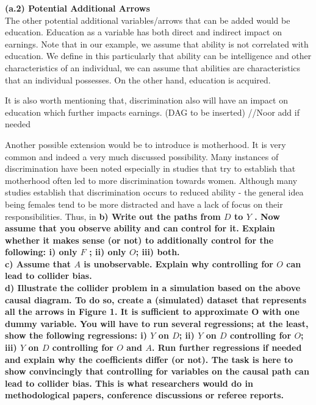 \documentclass[a4paper,12pt,oneside,English]{article}
\begin{document}
\textbf{(a.2) Potential Additional Arrows}\\
The other potential additional variables/arrows that can be added would be education. Education as a variable has both direct and indirect impact on earnings. Note that in our example, we assume that ability is not correlated with education. We define in this particularly that ability can be intelligence and other characteristics of an individual, we can assume that abilities are characteristics that an individual possesses. On the other hand, education is acquired.

It is also worth mentioning that, discrimination also will have an impact on education which further impacts earnings. (DAG to be inserted) //Noor add if needed

Another possible extension would be to introduce is motherhood. It is very common and indeed a very much discussed possibility. Many instances of discrimination have been noted especially in studies that try to establish that motherhood often led to more discrimination towards women. Although many studies establish that  discrimination occurs to reduced ability - the general idea being females tend to be more distracted and have a lack of focus on their responsibilities. Thus, in
\textbf{b) Write out the paths from $D$ to $Y$ . Now assume that you observe ability and can control for it. Explain whether it makes sense (or not) to additionally control for the following: i) only $F$ ; ii) only $O$; iii) both.}\\
\textbf{c) Assume that $A$ is unobservable. Explain why controlling for $O$ can lead to collider bias.}\\
\textbf{d) Illustrate the collider problem in a simulation based on the above causal diagram. To do so, create a (simulated) dataset that represents all the arrows in Figure 1. It is sufficient to approximate O with one dummy variable. You will have to run several regressions; at the least, show the following regressions: i) $Y$ on $D$; ii) $Y$ on $D$ controlling for $O$; iii) $Y$ on $D$ controlling for $O$ and $A$. Run further regressions if needed and explain why the coefficients differ (or not). The task is here to show convincingly that controlling for variables on the causal path can lead to collider bias. This is what researchers would do in methodological papers, conference discussions or referee reports.}
\end{document}
